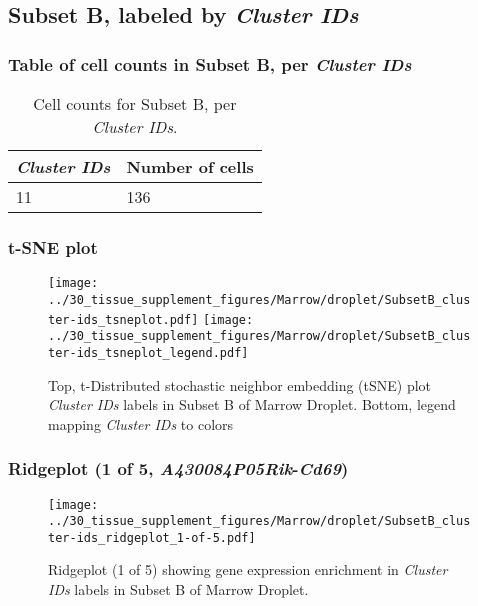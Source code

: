 \clearpage

\subsection{Subset B, labeled by \emph{Cluster IDs}}
\subsubsection{Table of cell counts in Subset B, per \emph{Cluster IDs}}\begin{table}[h]
\centering
\label{my-label}
\begin{tabular}{@{}ll@{}}
\toprule

\emph{Cluster IDs}& Number of cells \\ \midrule
11 & 136 \\
\bottomrule
\end{tabular}
\caption{Cell counts for Subset B, per \emph{Cluster IDs}.}
\end{table}

\clearpage
\subsubsection{t-SNE plot}
\begin{figure}[h]
\centering
\texttt{[image: ../30\_tissue\_supplement\_figures/Marrow/droplet/SubsetB\_cluster-ids\_tsneplot.pdf]}
\texttt{[image: ../30\_tissue\_supplement\_figures/Marrow/droplet/SubsetB\_cluster-ids\_tsneplot\_legend.pdf]}
\caption{Top, t-Distributed stochastic neighbor embedding (tSNE) plot  \emph{Cluster IDs} labels in Subset B of Marrow Droplet. Bottom, legend mapping \emph{Cluster IDs} to colors}
\end{figure}


\clearpage

\subsubsection{Ridgeplot (1 of 5, \emph{A430084P05Rik}-\emph{Cd69})}
\begin{figure}[h]
\centering
\texttt{[image: ../30\_tissue\_supplement\_figures/Marrow/droplet/SubsetB\_cluster-ids\_ridgeplot\_1-of-5.pdf]}

\caption{ Ridgeplot (1 of 5)  showing gene expression enrichment in \emph{Cluster IDs} labels in Subset B of Marrow Droplet. }
\end{figure}


\clearpage

